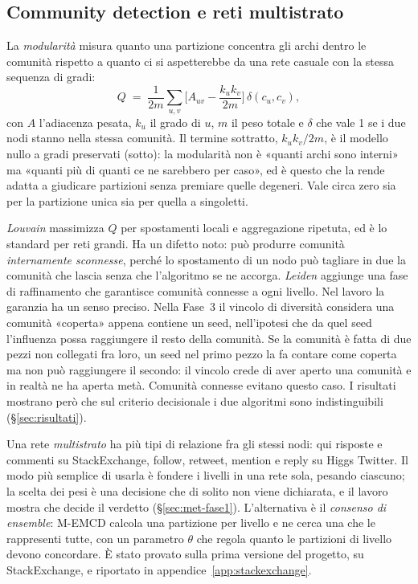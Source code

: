 \documentclass[11pt,a4paper]{article}
\newcommand{\sx}{StackExchange}
\newcommand{\hg}{Higgs Twitter}
\begin{document}
\subsection{Community detection e reti multistrato}
La \emph{modularità} \citep{newman2006} misura quanto una partizione concentra gli archi dentro le comunità rispetto a quanto ci si aspetterebbe da una rete casuale con la stessa sequenza di gradi:
\begin{equation}
  Q \;=\; \frac{1}{2m} \sum_{u,v} \Big[ A_{uv} - \frac{k_u k_v}{2m} \Big]\, \delta(c_u, c_v),
  \label{eq:modularita}
\end{equation}
con $A$ l'adiacenza pesata, $k_u$ il grado di $u$, $m$ il peso totale e $\delta$ che vale 1 se i due nodi stanno nella stessa comunità. Il termine sottratto, $k_u k_v / 2m$, è il modello nullo a gradi preservati (sotto): la modularità non è «quanti archi sono interni» ma «quanti più di quanti ce ne sarebbero per caso», ed è questo che la rende adatta a giudicare partizioni senza premiare quelle degeneri. Vale circa zero sia per la partizione unica sia per quella a singoletti.

\emph{Louvain} \citep{blondel2008} massimizza $Q$ per spostamenti locali e aggregazione ripetuta, ed è lo standard per reti grandi. Ha un difetto noto: può produrre comunità \emph{internamente sconnesse}, perché lo spostamento di un nodo può tagliare in due la comunità che lascia senza che l'algoritmo se ne accorga. \emph{Leiden} \citep{traag2019} aggiunge una fase di raffinamento che garantisce comunità connesse a ogni livello. Nel lavoro la garanzia ha un senso preciso. Nella Fase~3 il vincolo di diversità considera una comunità «coperta» appena contiene un seed, nell'ipotesi che da quel seed l'influenza possa raggiungere il resto della comunità. Se la comunità è fatta di due pezzi non collegati fra loro, un seed nel primo pezzo la fa contare come coperta ma non può raggiungere il secondo: il vincolo crede di aver aperto una comunità e in realtà ne ha aperta metà. Comunità connesse evitano questo caso. I risultati mostrano però che sul criterio decisionale i due algoritmi sono indistinguibili (\S\ref{sec:risultati}).

Una rete \emph{multistrato} ha più tipi di relazione fra gli stessi nodi: qui risposte e commenti su \sx{}, follow, retweet, mention e reply su \hg{}. Il modo più semplice di usarla è fondere i livelli in una rete sola, pesando ciascuno; la scelta dei pesi è una decisione che di solito non viene dichiarata, e il lavoro mostra che decide il verdetto (\S\ref{sec:met-fase1}). L'alternativa è il \emph{consenso di ensemble}: M-EMCD \citep{tagarelli2017} calcola una partizione per livello e ne cerca una che le rappresenti tutte, con un parametro $\theta$ che regola quanto le partizioni di livello devono concordare. È stato provato sulla prima versione del progetto, su \sx{}, e riportato in appendice~\ref{app:stackexchange}.
\end{document}
